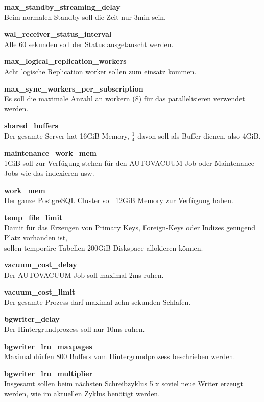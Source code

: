 \begin{description}
    \item \textbf{max\_standby\_streaming\_delay}\hfill \\Beim normalen Standby soll die Zeit nur 3min sein.
    \item \textbf{wal\_receiver\_status\_interval}\hfill \\Alle 60 sekunden soll der Status ausgetauscht werden.
    \item \textbf{max\_logical\_replication\_workers}\hfill \\Acht logische Replication worker sollen zum einsatz kommen.
    \item \textbf{max\_sync\_workers\_per\_subscription}\hfill \\Es soll die maximale Anzahl an workern (8) für das parallelisieren verwendet werden.
    \item \textbf{shared\_buffers}\hfill \\Der gesamte Server hat 16GiB Memory, \(\frac{1}{4}\) davon soll als Buffer dienen, also 4GiB.
    \item \textbf{maintenance\_work\_mem}\hfill \\1GiB soll zur Verfügung stehen für den \Gls{AUTOVACUUM}-Job oder Maintenance-Jobs wie das indexieren usw.
    \item \textbf{work\_mem}\hfill \\Der ganze \Gls{PostgreSQL Cluster} soll 12GiB Memory zur Verfügung haben.
    \item \textbf{temp\_file\_limit}\hfill \\Damit für das Erzeugen von Primary Keys, Foreign-Keys oder Indizes genügend Platz vorhanden ist,\\sollen temporäre Tabellen 200GiB Diskspace allokieren können.
    \item \textbf{vacuum\_cost\_delay}\hfill \\Der \Gls{AUTOVACUUM}-Job soll maximal 2ms ruhen.
    \item \textbf{vacuum\_cost\_limit}\hfill \\Der gesamte Prozess darf maximal zehn sekunden Schlafen.
    \item \textbf{bgwriter\_delay}\hfill \\Der Hintergrundprozess soll nur 10ms ruhen.
    \item \textbf{bgwriter\_lru\_maxpages}\hfill \\Maximal dürfen 800 Buffers vom Hintergrundprozess beschrieben werden.
    \item \textbf{bgwriter\_lru\_multiplier}\hfill \\Insgesamt sollen beim nächsten Schreibzyklus 5 x soviel neue Writer erzeugt werden, wie im aktuellen Zyklus benötigt werden.
\end{description}

